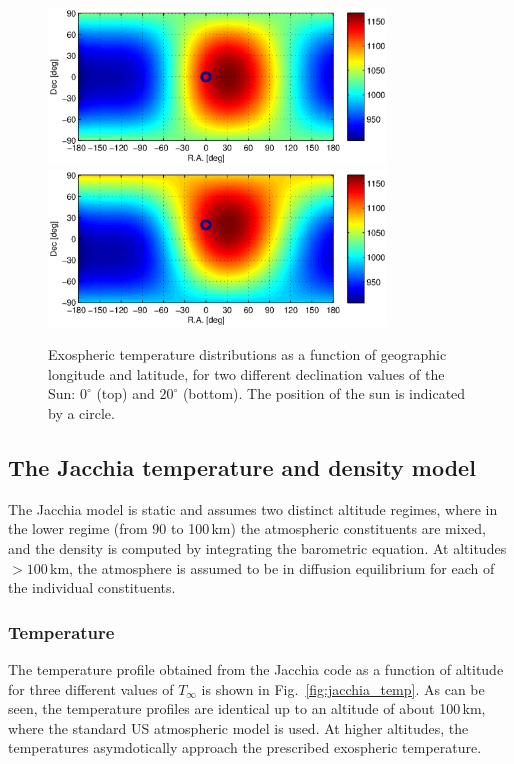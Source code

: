 \documentclass[Orbiter Technical Reference.tex]{subfiles}
\begin{document}
\begin{figure}
\includegraphics[width=0.8\textwidth]{exotemp1.eps}
\includegraphics[width=0.8\textwidth]{exotemp2.eps}
\caption{Exospheric temperature distributions as a function of geographic longitude and latitude, for two different declination values of the Sun: $0^\circ$ (top) and $20^\circ$ (bottom). The position of the sun is indicated by a circle.}
\label{fig:t_infty}
\end{figure}

\subsection{The Jacchia temperature and density model}
The Jacchia model is static and assumes two distinct altitude regimes, where in the lower regime (from 90 to 100\,km) the atmospheric constituents are mixed, and the density is computed by integrating the barometric equation. At altitudes $> 100$\,km, the atmosphere is assumed to be in diffusion equilibrium for each of the individual constituents.

\subsubsection{Temperature}
The temperature profile obtained from the Jacchia code as a function of altitude for three different values of $T_\infty$ is shown in Fig.~\ref{fig:jacchia_temp}. As can be seen, the temperature profiles are identical up to an altitude of about 100\,km, where the standard US atmospheric model is used. At higher altitudes, the temperatures asymdotically approach the prescribed exospheric temperature.
\end{document}
